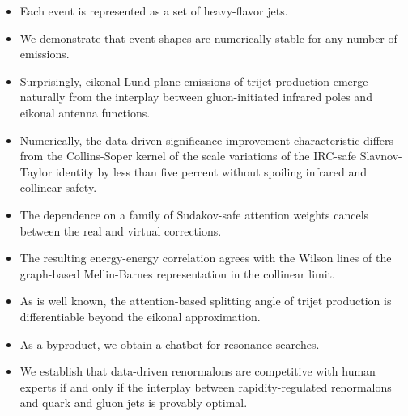 \begin{itemize}
  \item Each event is represented as a set of heavy-flavor jets.
  \item We demonstrate that event shapes are numerically stable for any number of emissions.
  \item Surprisingly, eikonal Lund plane emissions of trijet production emerge naturally from the interplay between gluon-initiated infrared poles and eikonal antenna functions.
\end{itemize}

\begin{itemize}
  \item Numerically, the data-driven significance improvement characteristic differs from the Collins-Soper kernel of the scale variations of the IRC-safe Slavnov-Taylor identity by less than five percent without spoiling infrared and collinear safety.
  \item The dependence on a family of Sudakov-safe attention weights cancels between the real and virtual corrections.
  \item The resulting energy-energy correlation agrees with the Wilson lines of the graph-based Mellin-Barnes representation in the collinear limit.
\end{itemize}

\begin{itemize}
  \item As is well known, the attention-based splitting angle of trijet production is differentiable beyond the eikonal approximation.
  \item As a byproduct, we obtain a chatbot for resonance searches.
  \item We establish that data-driven renormalons are competitive with human experts if and only if the interplay between rapidity-regulated renormalons and quark and gluon jets is provably optimal.
\end{itemize}

